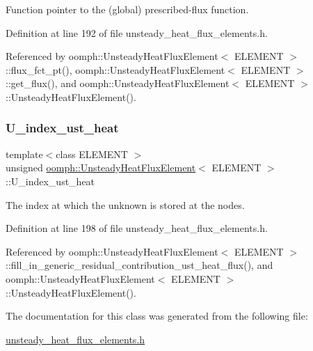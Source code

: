Function pointer to the (global) prescribed-\/flux function. 



Definition at line 192 of file unsteady\+\_\+heat\+\_\+flux\+\_\+elements.\+h.



Referenced by oomph\+::\+Unsteady\+Heat\+Flux\+Element$<$ E\+L\+E\+M\+E\+N\+T $>$\+::flux\+\_\+fct\+\_\+pt(), oomph\+::\+Unsteady\+Heat\+Flux\+Element$<$ E\+L\+E\+M\+E\+N\+T $>$\+::get\+\_\+flux(), and oomph\+::\+Unsteady\+Heat\+Flux\+Element$<$ E\+L\+E\+M\+E\+N\+T $>$\+::\+Unsteady\+Heat\+Flux\+Element().

\mbox{\label{classoomph_1_1UnsteadyHeatFluxElement_aa7109f19bb7404d1ba7abab5a2501d01}} 
\subsubsection{\texorpdfstring{U\+\_\+index\+\_\+ust\+\_\+heat}{U\_index\_ust\_heat}}
{\footnotesize\ttfamily template$<$class E\+L\+E\+M\+E\+NT $>$ \\
unsigned \hyperlink{classoomph_1_1UnsteadyHeatFluxElement}{oomph\+::\+Unsteady\+Heat\+Flux\+Element}$<$ E\+L\+E\+M\+E\+NT $>$\+::U\+\_\+index\+\_\+ust\+\_\+heat\hspace{0.3cm}{\ttfamily [private]}}



The index at which the unknown is stored at the nodes. 



Definition at line 198 of file unsteady\+\_\+heat\+\_\+flux\+\_\+elements.\+h.



Referenced by oomph\+::\+Unsteady\+Heat\+Flux\+Element$<$ E\+L\+E\+M\+E\+N\+T $>$\+::fill\+\_\+in\+\_\+generic\+\_\+residual\+\_\+contribution\+\_\+ust\+\_\+heat\+\_\+flux(), and oomph\+::\+Unsteady\+Heat\+Flux\+Element$<$ E\+L\+E\+M\+E\+N\+T $>$\+::\+Unsteady\+Heat\+Flux\+Element().



The documentation for this class was generated from the following file\+:\begin{DoxyCompactItemize}
\item 
\hyperlink{unsteady__heat__flux__elements_8h}{unsteady\+\_\+heat\+\_\+flux\+\_\+elements.\+h}\end{DoxyCompactItemize}
